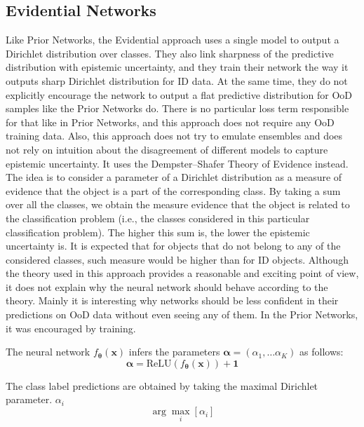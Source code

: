 \documentclass{article}
\begin{document}
\subsection{Evidential Networks}
Like Prior Networks, the Evidential approach \cite{evidential_classification} uses a single model to output a Dirichlet distribution over classes.
They also link sharpness of the predictive distribution with epistemic uncertainty, and they train their network the way it outputs sharp Dirichlet distribution for ID data.
At the same time, they do not explicitly encourage the network to output a flat predictive distribution for OoD samples like the Prior Networks do.
There is no particular loss term responsible for that like in Prior Networks, and this approach does not require any OoD training data.
Also, this approach does not try to emulate ensembles and does not rely on intuition about the disagreement of different models to capture epistemic uncertainty.
It uses the Dempster–Shafer Theory of Evidence \cite{dempster_shafer} instead.
The idea is to consider a parameter of a Dirichlet distribution as a measure of evidence that the object is a part of the corresponding class.
By taking a sum over all the classes, we obtain the measure evidence that the object is related to the classification problem (i.e., the classes considered in this particular classification problem).
The higher this sum is, the lower the epistemic uncertainty is.
It is expected that for objects that do not belong to any of the considered classes, such measure would be higher than for ID objects.
Although the theory used in this approach provides a reasonable and exciting point of view, it does not explain why the neural network should behave according to the theory.
Mainly it is interesting why networks should be less confident in their predictions on OoD data without even seeing any of them.
In the Prior Networks, it was encouraged by training.

The neural network $f_{\boldsymbol{\theta}}(\boldsymbol{x})$ infers the parameters $\boldsymbol{\alpha} = (\alpha_1, \dots \alpha_K)$ as follows:
\begin{equation}
\boldsymbol{\alpha} = \mathrm{ReLU}(f_{\boldsymbol{\theta}}(\boldsymbol{x})) + \boldsymbol{1}
\end{equation}

The class label predictions are obtained by taking the maximal Dirichlet parameter. $\alpha_i$
\begin{equation}
\arg\max\limits_i [\alpha_i]
\end{equation}
\end{document}

